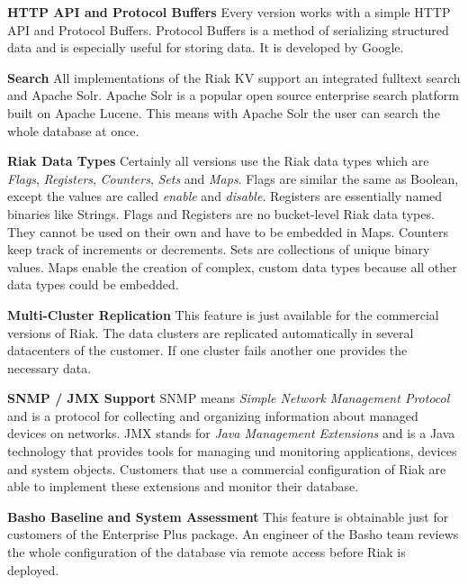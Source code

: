 \textbf{HTTP API and Protocol Buffers}\newline
Every version works with a simple HTTP API and Protocol Buffers. Protocol Buffers is a method of serializing structured data and is especially useful for storing data. It is developed by Google. \cite{GoogleDevelopers.06.04.2017}

\textbf{Search}\newline
All implementations of the Riak KV support an integrated fulltext search and Apache Solr. Apache Solr is a popular open source enterprise search platform  built on Apache Lucene. This means with Apache Solr the user can search the whole database at once. \cite{TheApacheSoftwareFoundation.06.04.2017}

\textbf{Riak Data Types}\newline
Certainly all versions use the Riak data types which are \textit{Flags}, \textit{Registers}, \textit{Counters}, \textit{Sets} and \textit{Maps}. Flags are similar the same as Boolean, except the values are called \textit{enable} and \textit{disable}. Registers are essentially named binaries like Strings. Flags and Registers are no bucket-level Riak data types. They cannot be used on their own and have to be embedded in Maps. Counters keep track of increments or decrements. Sets are collections of unique binary values. Maps enable the creation of complex, custom data types because all other data types could be embedded. \cite{Basho.06.04.2017}

\textbf{Multi-Cluster Replication}\newline
This feature is just available for the commercial versions of Riak. The data clusters are replicated automatically in several datacenters of the customer. If one cluster fails another one provides the necessary data. \cite{Basho.01.04.2017}

\textbf{SNMP / JMX Support}\newline
SNMP means \textit{Simple Network Management Protocol} and is a protocol for collecting and organizing information about managed devices on networks. \cite{L8ManeValidus.06.04.2017} JMX stands for \textit{Java Management Extensions} and is a Java technology that provides tools for managing und monitoring applications, devices and system objects. \cite{Bryanssm.06.04.2017} Customers that use a commercial configuration of Riak are able to implement these extensions and monitor their database.

\newpage

\textbf{Basho Baseline and System Assessment}\newline
This feature is obtainable just for customers of the Enterprise Plus package. An engineer of the Basho team reviews the whole configuration of the database via remote access before Riak is deployed. \cite{Basho.01.04.2017}



